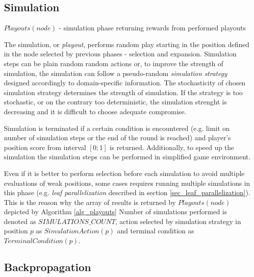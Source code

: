 \subsection{Simulation}
\label{sec_simulation}

\begin{algorithm}
\DontPrintSemicolon
\caption{$Playouts(node)$ - simulation phase returning rewards from performed playouts
\label{alg_playouts}}
\end{algorithm}

The simulation, or \emph{playout}, performs random play starting in the position defined in the
node selected by previous phases - selection and expansion. Simulation steps can be plain
random random actions or, to improve the strength of
simulation, the simulation can follow a pseudo-random \emph{simulation strategy} designed accordingly to
domain-specific information. The stochasticity of chosen simulation strategy determines the strength
of simulation. If the strategy is too stochastic, or on the contrary too deterministic, the
simulation strenght is decreasing and it is difficult to choose adequate compromise.

Simulation is terminated if a certain condition is encountered (e.g. limit on number of simulation
steps or the end of the round is reached) and player's position score from interval $[0;1]$ is
returned. Additionally, to speed up the simulation the simulation steps can be performed in
simplified game environment.

Even if it is better to perform selection before each simulation to avoid multiple 
evaluations of weak positions, some cases requires running multiple simulations in this phase
(e.g. \emph{leaf parallelization} described in section \ref{sec_leaf_parallelization}). This is
the reason why the array of results is returned by $Playouts(node)$ depicted by Algorithm
\ref{alg_playouts} Number of simulations performed is denoted as $SIMULATIONS\_COUNT$, action
selected by simulation strategy in position $p$ as $SimulationAction(p)$ and terminal condition
as $TerminalCondition(p)$.


\subsection{Backpropagation}

